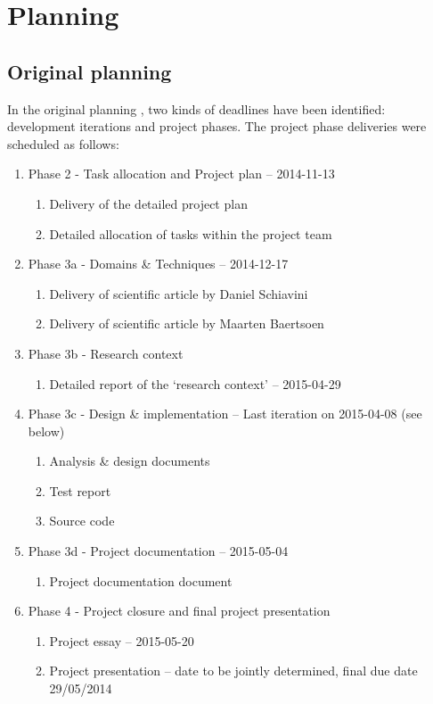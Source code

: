 
\section{Planning}
\label{sec:planning}

\subsection{Original planning}
In the original planning , two kinds of deadlines have been identified: development iterations and project phases.
The project phase deliveries were scheduled as follows:
 \begin{enumerate}
	\item Phase 2 - Task allocation and Project plan			-- 	2014-11-13
 	\begin{enumerate}
		\item Delivery of the detailed project plan 			
		\item Detailed allocation of tasks within the project team 
	\end {enumerate}
	\item Phase 3a - Domains \& Techniques					-- 	2014-12-17
 	\begin{enumerate}
		\item Delivery of scientific article by Daniel Schiavini
		\item Delivery of scientific article by Maarten Baertsoen
	\end {enumerate}
 	\item Phase 3b - Research context
 	\begin{enumerate}
		\item Detailed report of the `research context'  		-- 	2015-04-29
	\end {enumerate}
 	\item Phase 3c - Design \& implementation				-- Last iteration on 2015-04-08 (see below)
 	\begin{enumerate}
		\item Analysis \& design documents
		\item Test report
		\item Source code
	\end {enumerate}
 	\item Phase 3d - Project documentation					-- 	2015-05-04
 	\begin{enumerate}
		\item Project documentation document	
	\end {enumerate}
	\item Phase 4 - Project closure and final project presentation
 	\begin{enumerate}
		\item Project essay							-- 	2015-05-20
		\item Project presentation						-- 	date to be jointly determined, final due date 29/05/2014
	\end {enumerate}
\end {enumerate}
